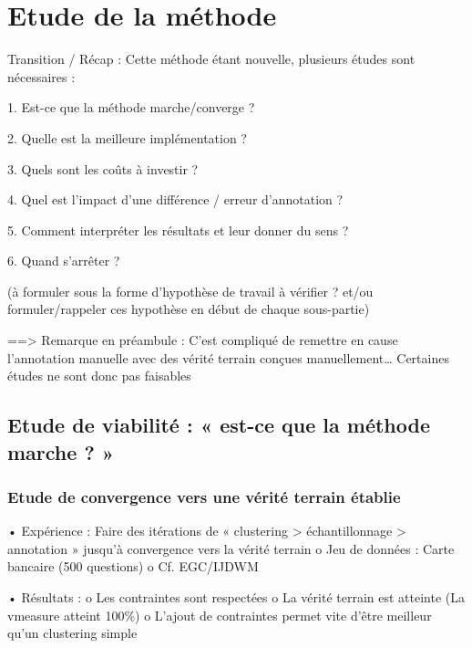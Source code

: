 \chapter{Etude de la méthode}
    \label{chapter:3_ETUDES}

    \minitoc

    Transition / Récap : Cette méthode étant nouvelle, plusieurs études sont nécessaires :

        1.	Est-ce que la méthode marche/converge ?

        2.	Quelle est la meilleure implémentation ? 

        3.	Quels sont les coûts à investir ?

        4.	Quel est l’impact d’une différence / erreur d’annotation ?

        5.	Comment interpréter les résultats et leur donner du sens ?

        6.	Quand s’arrêter ?

        (à formuler sous la forme d’hypothèse de travail à vérifier ?
        et/ou formuler/rappeler ces hypothèse en début de chaque sous-partie)
        
    ==>	Remarque en préambule : C’est compliqué de remettre en cause l’annotation manuelle avec des vérité terrain conçues manuellement… Certaines  études ne sont donc pas faisables
    

    \section{Etude de viabilité : « est-ce que la méthode marche ? »}

        \subsection{Etude de convergence vers une vérité terrain établie}

        •	Expérience : Faire des itérations de « clustering > échantillonnage > annotation » jusqu’à convergence vers la vérité terrain
            o	Jeu de données : Carte bancaire (500 questions)
            o	Cf. EGC/IJDWM

        •	Résultats :
            o	Les contraintes sont respectées
            o	La vérité terrain est atteinte (La vmeasure atteint 100\%)
            o	L’ajout de contraintes permet vite d’être meilleur qu’un clustering simple


